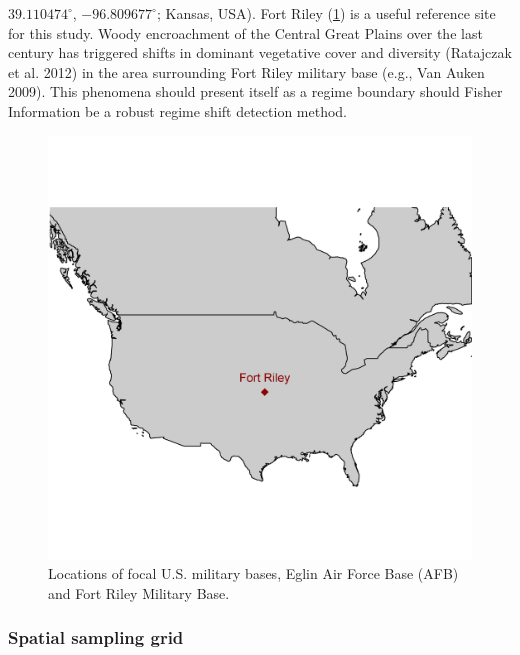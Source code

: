 \documentclass[12pt,twoside,openany]{reedthesis}
\begin{document}
\(39.110474^{\circ}\), \(-96.809677^{\circ}\); Kansas, USA). Fort Riley
(\ref{fig:basesOfInterestMap}) is a useful reference site for this
study. Woody encroachment of the Central Great Plains over the last
century has triggered shifts in dominant vegetative cover and diversity
(Ratajczak et al. 2012) in the area surrounding Fort Riley military base
(e.g., Van Auken 2009). This phenomena should present itself as a regime
boundary should Fisher Information be a robust regime shift detection
method.
\begin{figure}

{\centering \includegraphics[width=0.85\linewidth]{./chapterFiles/fisherSpatial/figures/figsCalledInDiss/basesOfInterestMap} 

}

\caption{Locations of focal U.S. military bases, Eglin Air Force Base (AFB) and Fort Riley Military Base.}\label{fig:basesOfInterestMap}
\end{figure}
\subsubsection{Spatial sampling grid}\label{spatial-sampling-grid}
\end{document}
